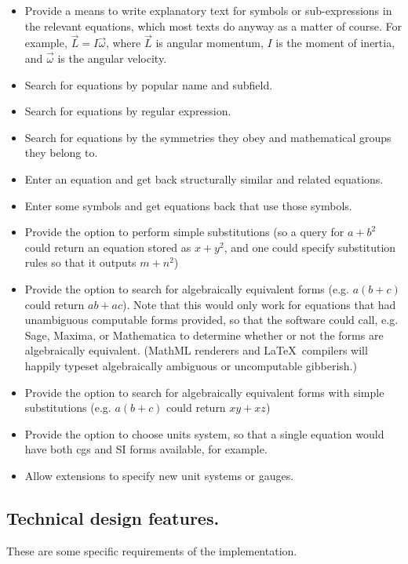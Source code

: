 \documentclass[12pt,letterpaper]{article}
\begin{document}
\begin{itemize}
\item Provide a means to write explanatory text for symbols or sub-expressions in the relevant equations,
      which most texts do anyway as a matter of course.
      For example, $\vec{L} = I \vec{\omega}$, where
      $\vec{L}$ is angular momentum,
      $I$ is the moment of inertia, and
      $\vec{\omega}$ is the angular velocity.
\item Search for equations by popular name and subfield.
\item Search for equations by regular expression.
\item Search for equations by the symmetries they obey and mathematical groups they belong to.
\item Enter an equation and get back structurally similar and related equations.
\item Enter some symbols and get equations back that use those symbols.
\item Provide the option to perform simple substitutions
      (so a query for $a+b^2$ could return an equation stored as $x+y^2$,
      and one could specify substitution rules so that it outputs $m + n^2$)
\item Provide the option to search for algebraically equivalent forms
      (e.g. $a(b+c)$ could return $a b + a c$).
      Note that this would only work for equations that had unambiguous computable forms provided,
      so that the software could call,
      e.g. Sage, Maxima, or Mathematica to determine whether or not the forms are algebraically equivalent.
      (MathML renderers and \LaTeX\ compilers will happily typeset algebraically ambiguous or uncomputable gibberish.)
\item Provide the option to search for algebraically equivalent forms with simple substitutions
      (e.g.  $a(b+c)$ could return $ x y + x z$)
\item Provide the option to choose units system,
      so that a single equation would have both cgs and SI forms available, for example.
\item Allow extensions to specify new unit systems or gauges.
\end{itemize}

\subsection{Technical design features.}

These are some specific requirements of the implementation.
\end{document}
